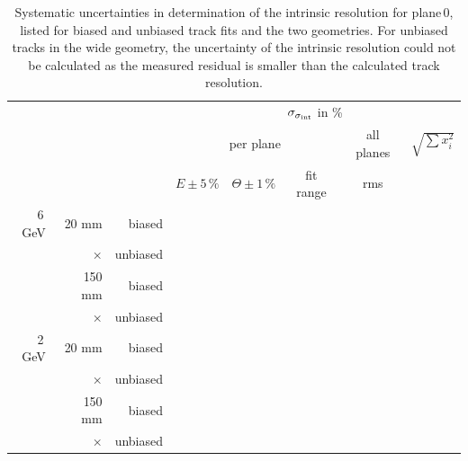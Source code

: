 \begin{table}[tbp]
 \begin{center}
  \begin{tabular}{r|r|r|c|c|c|c||c}
  \multicolumn{3}{c|}{} & \multicolumn{5}{c}{$\sigma_{\sigma_{\textrm{int}}}$ in \%}\\
  \multicolumn{3}{c|}{} & \multicolumn{3}{c|}{per plane} & all planes& $\sqrt{\sum x_i^2}$\\
  \multicolumn{3}{c|}{} &$E\pm5\,\%$ & $\Theta\pm1\,\%$ & fit range & rms &  \\ \hline
  6\,GeV & 20 mm   &  biased  &   &  &  &  &    \\
         & ×       & unbiased &   &  &  &  &    \\
	 & 150 mm  &  biased  &   &  &  &  &    \\
	 & ×       & unbiased &   &  &  &  &    \\ \hline
  2\,GeV & 20 mm   &  biased  &   &  &  &  &    \\
         & ×       & unbiased &   &  &  &  &    \\
	 & 150 mm  &  biased  &   &  &  &  &    \\
	 & ×       & unbiased &   &  &  &  &    \\ 
  \end{tabular}
    \caption[Systematic uncertainties for plane\,0]{Systematic uncertainties in determination of the intrinsic resolution for plane\,0, listed for biased and unbiased track fits and the two geometries.
  For unbiased tracks in the wide geometry, the uncertainty of the intrinsic resolution could not be calculated as the measured residual is smaller than the calculated track resolution.}
  \label{tab:uncerts}
 \end{center}
\end{table}

